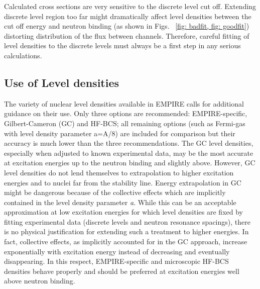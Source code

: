Calculated cross sections are very sensitive to the discrete level cut off.
Extending discrete level region too far might dramatically affect level
densities between the cut off energy and neutron binding (as shown in Figs.~%
\ref{fig: badfit, fig: goodfit}) distorting distribution of the flux between
channels. Therefore, careful fitting of level densities to the discrete
levels must always be a first step in any serious calculations.

\subsection{Use of Level densities}

The variety of nuclear level densities available in EMPIRE calls for
additional guidance on their use. Only three options are recommended:
EMPIRE-specific, Gilbert-Cameron (GC) and HF-BCS; all remaining options
(such as Fermi-gas with level density parameter a=A/8) are included for
comparison but their accuracy is much lower than the three recommendations.
The GC level densities, especially when adjusted to known experimental data,
may be the most accurate at excitation energies up to the neutron binding
and slightly above. However, GC level densities do not lend themselves to
extrapolation to higher excitation energies and to nuclei far from the
stability line. Energy extrapolation in GC might be dangerous because of the
collective effects which are implicitly contained in the level density
parameter \textit{a}. While this can be an acceptable approximation at low
excitation energies for which level densities are fixed by fitting
experimental data (discrete levels and neutron resonance spacings), there is
no physical justification for extending such a treatment to higher energies.
In fact, collective effects, as implicitly accounted for in the GC approach,
increase exponentially with excitation energy instead of decreasing and
eventually disappearing. In this respect, EMPIRE-specific and microscopic
HF-BCS densities behave properly and should be preferred at excitation
energies well above neutron binding.

